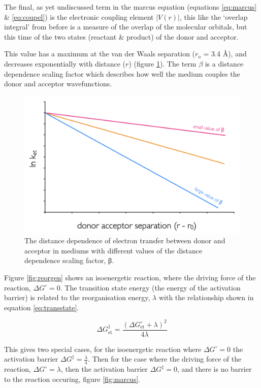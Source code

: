 \documentclass[
]{book}
\begin{document}
The final, as yet undiscussed term in the marcus equation (equations \eqref{eq:marcus} \& \eqref{eq:coupel}) is the electronic coupling element \(|V(r)|\), this like the `overlap integral' from before is a measure of the overlap of the molecular orbitals, but this time of the two states (reactant \& product) of the donor and acceptor.

This value has a maximum at the van der Waals separation (\(r_o\) = 3.4 Å), and decreases exponentially with distance (\(r\)) (figure \ref{fig:distdepend}). The term \(\beta\) is a distance dependence scaling factor which describes how well the medium couples the donor and acceptor wavefunctions.

\begin{figure}

{\centering \includegraphics[width=0.6\linewidth]{images/distdepend} 

}

\caption{The distance dependence of electron transfer between donor and acceptor in mediums with different values of the distance dependence scaling factor, β. }\label{fig:distdepend}
\end{figure}

Figure \ref{fig:reorgen} shows an isoenergetic reaction, where the driving force of the reaction, \(\Delta G^\circ=0\). The transition state energy (the energy of the activation barrier) is related to the reorganisation energy, \(\lambda\) with the relationship shown in equation \eqref{eq:transstate}.

\begin{equation}
\Delta G^\ddagger_{\textrm{et}}=\frac{(\Delta G^\circ_{\textrm{et}}+ \lambda)^2}{4\lambda}
\label{eq:transstate}
\end{equation}

This gives two special cases, for the isoenergetic reaction where \(\Delta G^\circ=0\) the activation barrier \(\Delta G^\ddagger=\frac{\lambda}{4}\). Then for the case where the driving force of the reaction, \(\Delta G^\circ=\lambda\), then the activation barrier \(\Delta G^\ddagger=0\), and there is no barrier to the reaction occuring, figure \ref{fig:marcus}.
\end{document}
